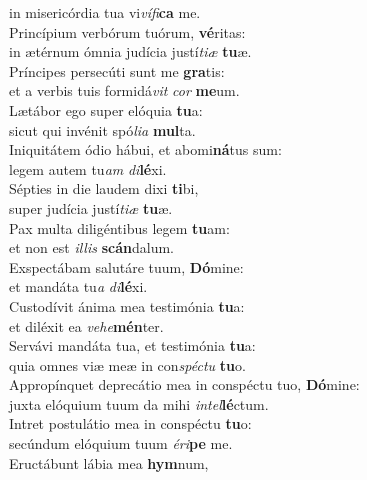 \oddverse in misericórdia tua vi\textit{ví}\textit{fi}\textbf{ca} me.\\
\evenverse Princípium verbórum tuórum, \textbf{vé}ritas:~\*\\
\evenverse in ætérnum ómnia judícia justí\textit{ti}\textit{æ} \textbf{tu}æ.\\
\oddverse Príncipes persecúti sunt me \textbf{gra}tis:~\*\\
\oddverse et a verbis tuis formidá\textit{vit} \textit{cor} \textbf{me}um.\\
\evenverse Lætábor ego super elóquia \textbf{tu}a:~\*\\
\evenverse sicut qui invénit spó\textit{li}\textit{a} \textbf{mul}ta.\\
\oddverse Iniquitátem ódio hábui, et abomi\textbf{ná}tus sum:~\*\\
\oddverse legem autem tu\textit{am} \textit{di}\textbf{lé}xi.\\
\evenverse Sépties in die laudem dixi \textbf{ti}bi,~\*\\
\evenverse super judícia justí\textit{ti}\textit{æ} \textbf{tu}æ.\\
\oddverse Pax multa diligéntibus legem \textbf{tu}am:~\*\\
\oddverse et non est \textit{il}\textit{lis} \textbf{scán}dalum.\\
\evenverse Exspectábam salutáre tuum, \textbf{Dó}mine:~\*\\
\evenverse et mandáta tu\textit{a} \textit{di}\textbf{lé}xi.\\
\oddverse Custodívit ánima mea testimónia \textbf{tu}a:~\*\\
\oddverse et diléxit ea \textit{ve}\textit{he}\textbf{mén}ter.\\
\evenverse Servávi mandáta tua, et testimónia \textbf{tu}a:~\*\\
\evenverse quia omnes viæ meæ in con\textit{spé}\textit{ctu} \textbf{tu}o.\\
\oddverse Appropínquet deprecátio mea in conspéctu tuo, \textbf{Dó}mine:~\*\\
\oddverse juxta elóquium tuum da mihi \textit{in}\textit{tel}\textbf{lé}ctum.\\
\evenverse Intret postulátio mea in conspéctu \textbf{tu}o:~\*\\
\evenverse secúndum elóquium tuum \textit{é}\textit{ri}\textbf{pe} me.\\
\oddverse Eructábunt lábia mea \textbf{hym}num,~\*\\
